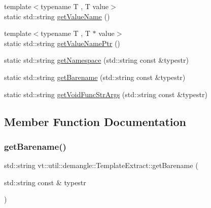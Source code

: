\begin{DoxyCompactItemize}
{\footnotesize template$<$typename T , T value$>$ }\\static std\+::string \hyperlink{structvt_1_1util_1_1demangle_1_1_template_extract_afae798a13fb482fdd8fc668af2c3f0d4}{get\+Value\+Name} ()
\item 
{\footnotesize template$<$typename T , T $\ast$ value$>$ }\\static std\+::string \hyperlink{structvt_1_1util_1_1demangle_1_1_template_extract_a78f655ef251d1a4a542291d84dc38917}{get\+Value\+Name\+Ptr} ()
\item 
static std\+::string \hyperlink{structvt_1_1util_1_1demangle_1_1_template_extract_a5e896032f040eedc15e6e6b1397a6bfc}{get\+Namespace} (std\+::string const \&typestr)
\item 
static std\+::string \hyperlink{structvt_1_1util_1_1demangle_1_1_template_extract_aa9a0cc82115687324c7e10d0b27f0977}{get\+Barename} (std\+::string const \&typestr)
\item 
static std\+::string \hyperlink{structvt_1_1util_1_1demangle_1_1_template_extract_a7085981a1d4ca05c458affcc2a5ca1cc}{get\+Void\+Func\+Str\+Args} (std\+::string const \&typestr)
\end{DoxyCompactItemize}


\subsection{Member Function Documentation}
\mbox{\label{structvt_1_1util_1_1demangle_1_1_template_extract_aa9a0cc82115687324c7e10d0b27f0977}} 
\subsubsection{\texorpdfstring{get\+Barename()}{getBarename()}}
{\footnotesize\ttfamily std\+::string vt\+::util\+::demangle\+::\+Template\+Extract\+::get\+Barename (\begin{DoxyParamCaption}\item[{std\+::string const \&}]{typestr }\end{DoxyParamCaption})\hspace{0.3cm}{\ttfamily [static]}}

